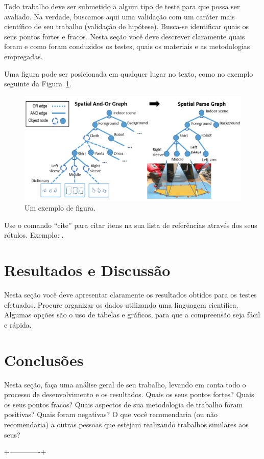 \documentclass[twoside,conference,a4paper]{IEEEtran}
\begin{document}
Todo trabalho deve ser submetido a algum tipo de teste para que possa ser avaliado. Na verdade, buscamos aqui uma validação com um caráter mais científico de seu trabalho (validação de hipótese). Busca-se identificar quais os seus pontos fortes e fracos. Nesta seção você deve descrever claramente quais foram e como foram conduzidos os testes, quais os materiais e as metodologias empregadas.   

Uma figura pode ser posicionada em qualquer lugar no texto, como no exemplo seguinte da Figura~\ref{fig:fig1}.

\begin{figure}[ht]
\centering
\includegraphics[width=1\hsize]{figuras/pipeline.png}
\caption{Um exemplo de figura.}
\label{fig:fig1}
\end{figure}

Use o comando ``cite'' para citar itens na sua lista de
referências através dos seus rótulos. Exemplo: \cite{Rowling:1997}\cite{Reynolds:2009a}\cite{Michalowski:2006}.


\section{Resultados e Discussão}

Nesta seção você deve apresentar claramente os resultados obtidos para os testes efetuados. Procure organizar os dados utilizando uma linguagem científica. Algumas opções são o uso de tabelas e gráficos, para que a compreensão seja fácil e rápida. 

\section{Conclusões}

Nesta seção, faça uma análise geral de seu trabalho, levando em conta todo o processo de desenvolvimento e os resultados. Quais os seus pontos fortes? Quais os seus pontos fracos? Quais aspectos de sua metodologia de trabalho foram positivas? Quais foram negativas? O que você recomendaria (ou não recomendaria) a outras pessoas que estejam realizando trabalhos similares aos seus? 


 +-------------+






\end{document}
